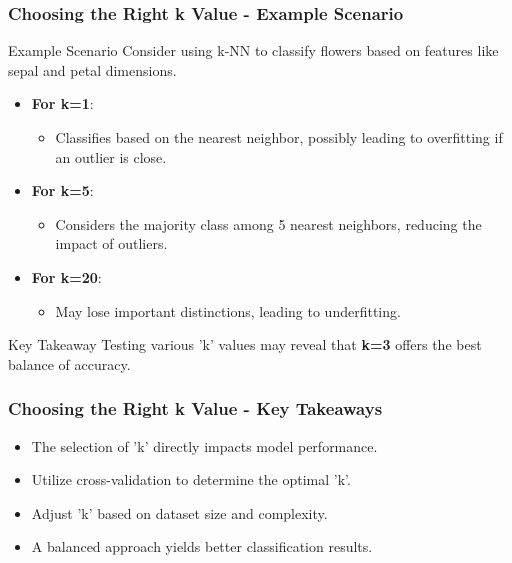\documentclass[aspectratio=169]{beamer}
\begin{document}
\begin{frame}[fragile]
    \frametitle{Choosing the Right k Value - Example Scenario}
    \begin{block}{Example Scenario}
        Consider using k-NN to classify flowers based on features like sepal and petal dimensions.
    \end{block}
    \begin{itemize}
        \item \textbf{For k=1}: 
        \begin{itemize}
            \item Classifies based on the nearest neighbor, possibly leading to overfitting if an outlier is close.
        \end{itemize}

        \item \textbf{For k=5}: 
        \begin{itemize}
            \item Considers the majority class among 5 nearest neighbors, reducing the impact of outliers.
        \end{itemize}

        \item \textbf{For k=20}: 
        \begin{itemize}
            \item May lose important distinctions, leading to underfitting.
        \end{itemize}
    \end{itemize}
    \begin{block}{Key Takeaway}
        Testing various 'k' values may reveal that \textbf{k=3} offers the best balance of accuracy.
    \end{block}
\end{frame}

\begin{frame}[fragile]
    \frametitle{Choosing the Right k Value - Key Takeaways}
    \begin{itemize}
        \item The selection of 'k' directly impacts model performance.
        \item Utilize cross-validation to determine the optimal 'k'.
        \item Adjust 'k' based on dataset size and complexity.
        \item A balanced approach yields better classification results.
    \end{itemize}
\end{frame}
\end{document}
